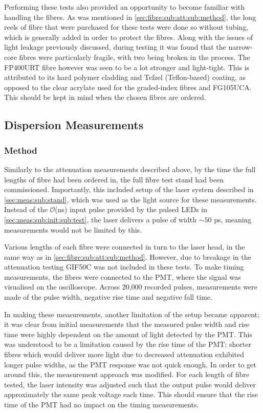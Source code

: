 \documentclass[a4paper,11pt]{article}
\let\oldsim\sim
\renewcommand{\sim}{{\oldsim}}
\begin{document}
Performing these tests also provided an opportunity to become familiar with handling the fibres. As was mentioned in \cref{sec:fibre:sub:att:sub:method}, the long reels of fibre that were purchased for these tests were done so without tubing, which is generally added in order to protect the fibres. Along with the issues of light leakage previously discussed, during testing it was found that the narrow-core fibres were particularly fragile, with two being broken in the process. The FP400URT fibre however was seen to be a lot stronger and light-tight. This is attributed to its hard polymer cladding and Tefzel (Teflon-based) coating, as opposed to the clear acrylate used for the graded-index fibres and FG105UCA. This should be kept in mind when the chosen fibres are ordered.

\subsection{Dispersion Measurements}

\subsubsection{Method}

Similarly to the attenuation measurements described above, by the time the full lengths of fibre had been ordered in, the full fibre test stand had been commissioned. Importantly, this included setup of the laser system described in \cref{sec:meas:sub:stand}, which was used as the light source for these measurements. Instead of the $\mathcal{O}$(ns) input pulse provided by the pulsed LEDs in \cref{sec:meas:sub:init:sub:test}, the laser delivers a pulse of width $\sim50$ ps, meaning measurements would not be limited by this.

Various lengths of each fibre were connected in turn to the laser head, in the same way as in \cref{sec:fibre:sub:att:sub:method}. However, due to breakage in the attenuation testing GIF50C was not included in these tests. To make timing measurements, the fibres were connected to the PMT, where the signal was visualised on the oscilloscope. Across 20,000 recorded pulses, measurements were made of the pulse width, negative rise time and negative fall time.

In making these measurements, another limitation of the setup became apparent; it was clear from initial measurements that the measured pulse width and rise time were highly dependent on the amount of light detected by the PMT. This was understood to be a limitation caused by the rise time of the PMT; shorter fibres which would deliver more light due to decreased attenuation exhibited longer pulse widths, as the PMT response was not quick enough. In order to get around this, the measurement approach was modified. For each length of fibre tested, the laser intensity was adjusted such that the output pulse would deliver approximately the same peak voltage each time. This should ensure that the rise time of the PMT had no impact on the timing measurements.
\end{document}
